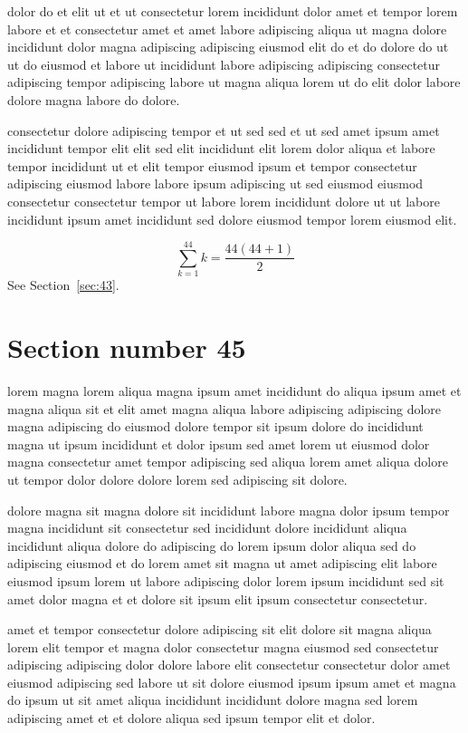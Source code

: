 \documentclass{article}
\begin{document}
dolor do et elit ut et ut consectetur lorem incididunt dolor amet et tempor lorem labore et et consectetur amet et amet labore adipiscing aliqua ut magna dolore incididunt dolor magna adipiscing adipiscing eiusmod elit do et do dolore do ut ut do eiusmod et labore ut incididunt labore adipiscing adipiscing consectetur adipiscing tempor adipiscing labore ut magna aliqua lorem ut do elit dolor labore dolore magna labore do dolore.

consectetur dolore adipiscing tempor et ut sed sed et ut sed amet ipsum amet incididunt tempor elit elit sed elit incididunt elit lorem dolor aliqua et labore tempor incididunt ut et elit tempor eiusmod ipsum et tempor consectetur adipiscing eiusmod labore labore ipsum adipiscing ut sed eiusmod eiusmod consectetur consectetur tempor ut labore lorem incididunt dolore ut ut labore incididunt ipsum amet incididunt sed dolore eiusmod tempor lorem eiusmod elit.

\begin{equation} \sum_{k=1}^{44} k = \frac{44(44+1)}{2} \end{equation}
See Section~\ref{sec:43}.

\section{Section number 45}\label{sec:45}
lorem magna lorem aliqua magna ipsum amet incididunt do aliqua ipsum amet et magna aliqua sit et elit amet magna aliqua labore adipiscing adipiscing dolore magna adipiscing do eiusmod dolore tempor sit ipsum dolore do incididunt magna ut ipsum incididunt et dolor ipsum sed amet lorem ut eiusmod dolor magna consectetur amet tempor adipiscing sed aliqua lorem amet aliqua dolore ut tempor dolor dolore dolore lorem sed adipiscing sit dolore.

dolore magna sit magna dolore sit incididunt labore magna dolor ipsum tempor magna incididunt sit consectetur sed incididunt dolore incididunt aliqua incididunt aliqua dolore do adipiscing do lorem ipsum dolor aliqua sed do adipiscing eiusmod et do lorem amet sit magna ut amet adipiscing elit labore eiusmod ipsum lorem ut labore adipiscing dolor lorem ipsum incididunt sed sit amet dolor magna et et dolore sit ipsum elit ipsum consectetur consectetur.

amet et tempor consectetur dolore adipiscing sit elit dolore sit magna aliqua lorem elit tempor et magna dolor consectetur magna eiusmod sed consectetur adipiscing adipiscing dolor dolore labore elit consectetur consectetur dolor amet eiusmod adipiscing sed labore ut sit dolore eiusmod ipsum ipsum amet et magna do ipsum ut sit amet aliqua incididunt incididunt dolore magna sed lorem adipiscing amet et et dolore aliqua sed ipsum tempor elit et dolor.
\end{document}
